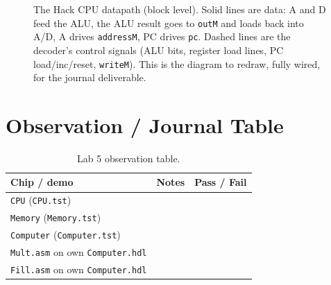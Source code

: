 \documentclass[11pt]{article}
\begin{document}
\begin{figure}[h]
  \caption{The Hack CPU datapath (block level). Solid lines are data: A and D feed the ALU, the ALU result goes to \texttt{outM} and loads back into A/D, A drives \texttt{addressM}, PC drives \texttt{pc}. Dashed lines are the decoder's control signals (ALU bits, register load lines, PC load/inc/reset, \texttt{writeM}). This is the diagram to redraw, fully wired, for the journal deliverable.}
  \label{fig:lab5-cpu}
\end{figure}

\section{Observation / Journal Table}

\begin{table}[h]
\centering
\small
\begin{tabular}{@{}l l c@{}}
\toprule
Chip / demo & Notes & Pass / Fail \\
\midrule
\texttt{CPU} (\texttt{CPU.tst}) & & \\
\texttt{Memory} (\texttt{Memory.tst}) & & \\
\texttt{Computer} (\texttt{Computer.tst}) & & \\
\texttt{Mult.asm} on own \texttt{Computer.hdl} & & \\
\texttt{Fill.asm} on own \texttt{Computer.hdl} & & \\
\bottomrule
\end{tabular}
\caption{Lab 5 observation table.}
\label{tab:lab5-observations}
\end{table}
\end{document}

